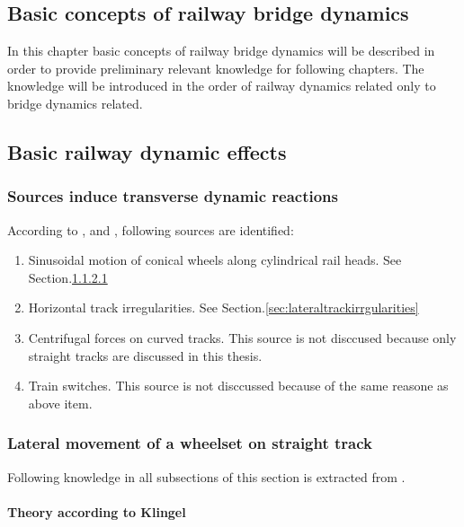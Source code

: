 \begin{appendices}

\chapter{Basic concepts of railway bridge dynamics}

In this chapter basic concepts of railway bridge dynamics will be described in order to provide preliminary relevant knowledge for following chapters. The knowledge will be introduced in the order of railway dynamics related only to bridge dynamics related. 

\section{Basic railway dynamic effects}

\subsection{Sources induce transverse dynamic reactions}
According to \citet{da2007dynamic}, \citet{fryba1996dynamics} and \citet{EC12}, following sources are identified:

\begin{enumerate} [-]
    \item Sinusoidal motion of conical wheels along cylindrical rail heads. See Section.\ref{sec:klingel}
    \item Horizontal track irregularities. See Section.\ref{sec:lateraltrackirrgularities}
    \item Centrifugal forces on curved tracks. This source is not disccused because only straight tracks are discussed in this thesis.
    \item Train switches. This source is not disccussed because of the same reasone as above item.
\end{enumerate}

\subsection{Lateral movement of a wheelset on straight track}

Following knowledge in all subsections of this section is extracted from \citet{esveld2001modern}. 

\subsubsection{Theory according to Klingel}\label{sec:klingel}


\end{appendices}
